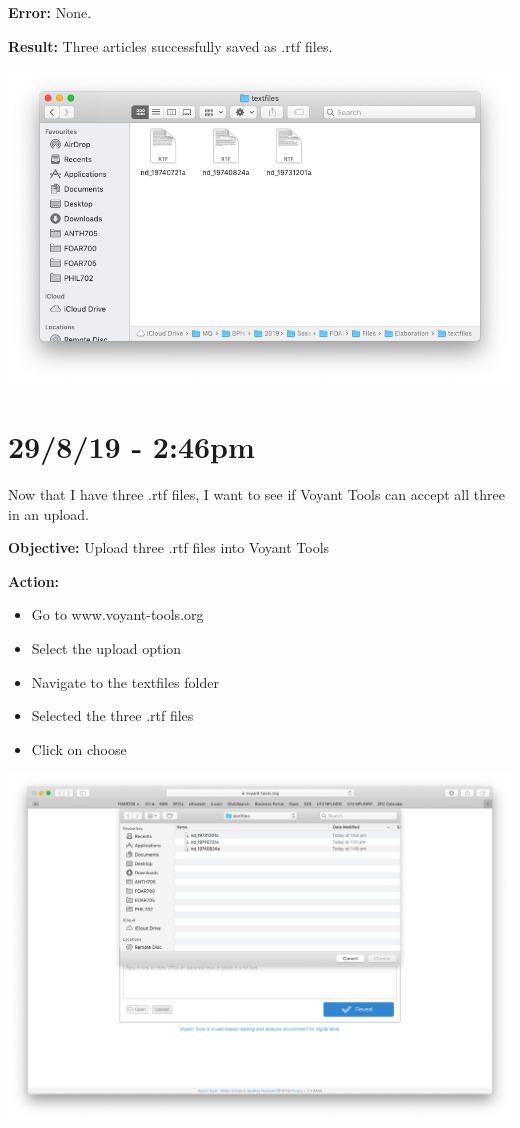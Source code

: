\documentclass{article}
\begin{document}
\textbf{Error:} None.

\textbf{Result:} Three articles successfully saved as .rtf files.

\includegraphics[width=\textwidth]{textfiles.png}

\section*{29/8/19 - 2:46pm}

Now that I have three .rtf files, I want to see if Voyant Tools can accept all three in an upload.

\textbf{Objective:} Upload three .rtf files into Voyant Tools

\textbf{Action:}

\begin{itemize}
    \item Go to www.voyant-tools.org
    \item Select the upload option
    \item Navigate to the textfiles folder
    \item Selected the three .rtf files
    \item Click on choose
\end{itemize}

\includegraphics[width=\textwidth]{voyantupload.png}
\end{document}
